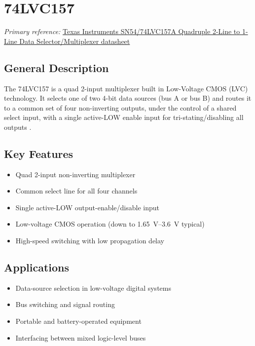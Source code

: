 \documentclass[12pt,a4paper]{report}
\newcommand{\datasheetref}[2]{%
  \noindent\textit{Primary reference:} \href{#2}{#1}%
  \par\vspace{0.6em}
}
\begin{document}
\chapter{74LVC157}
\datasheetref{Texas Instruments SN54/74LVC157A Quadruple 2-Line to 1-Line Data Selector/Multiplexer datasheet}{https://www.ti.com/lit/ds/symlink/sn74lvc157a.pdf}

\section{General Description}
The 74LVC157 is a quad 2-input multiplexer built in Low-Voltage CMOS
(LVC) technology. It selects one of two 4-bit data sources (bus A or bus
B) and routes it to a common set of four non-inverting outputs, under the
control of a shared select input, with a single active-LOW enable input
for tri-stating/disabling all outputs \cite{lvc157}.

\section{Key Features}
\begin{itemize}
  \item Quad 2-input non-inverting multiplexer
  \item Common select line for all four channels
  \item Single active-LOW output-enable/disable input
  \item Low-voltage CMOS operation (down to 1.65~V--3.6~V typical)
  \item High-speed switching with low propagation delay
\end{itemize}

\section{Applications}
\begin{itemize}
  \item Data-source selection in low-voltage digital systems
  \item Bus switching and signal routing
  \item Portable and battery-operated equipment
  \item Interfacing between mixed logic-level buses
\end{itemize}
\end{document}
